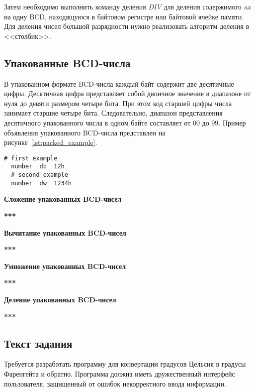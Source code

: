 Затем необходимо выполнить команду деления \textit{DIV} для деления содержимого
\textit{ax} на одну BCD, находящуюся в байтовом регистре или байтовой ячейке памяти.
Для деления чисел большой разрядности нужно реализовать алгоритм деления в <<столбик>>.

\subsection{Упакованные BCD-числа}
\label{sub:packed}

В упакованном формате BCD-числа каждый байт содержит две десятичные цифры.
Десятичная цифра представляет собой двоичное значение в диапазоне от нуля до девяти
размером четыре бита. При этом код старшей цифры числа занимает старшие четыре бита.
Следовательно, диапазон представления десятичного упакованного числа в одном байте
составляет от $ 00 $ до $ 99 $. Пример объявления упакованного BCD-числа представлен
на рисунке~\ref{lst:packed_example}.

\begin{lstlisting}[caption=Пример объявления упакованного BCD-числа,label=lst:packed_example,
language={[x86masm]Assembler},basicstyle=\scriptsize\ttfamily]
  # first example
  number  db  12h
  # second example
  number  dw  1234h
\end{lstlisting}

\textbf{Сложение упакованных BCD-чисел}

\textbf{***}

\textbf{Вычитание упакованных BCD-чисел}

\textbf{***}

\textbf{Умножение упакованных BCD-чисел}

\textbf{***}

\textbf{Деление упакованных BCD-чисел}

\textbf{***}

\subsection{Текст задания}

Требуется разработать программу для конвертации градусов Цельсия в градусы Фаренгейта и обратно.
Программа должна иметь дружественный интерфейс пользователя, защищенный от ошибок
некорректного ввода информации.

\newpage
